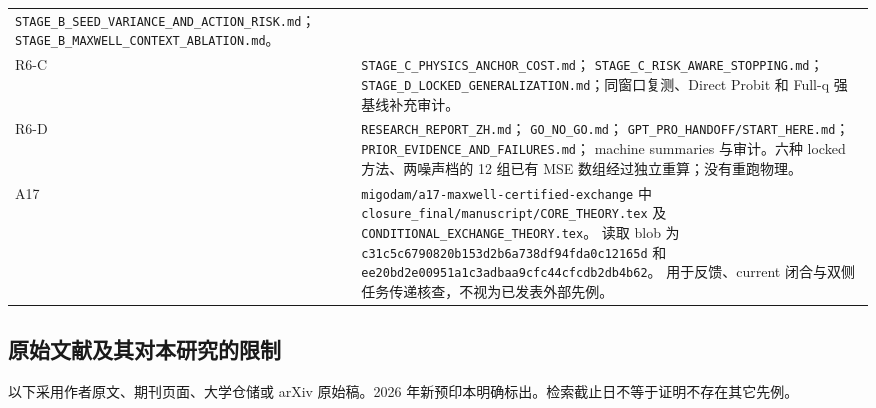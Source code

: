 \begin{longtable}{p{.08\linewidth}p{.84\linewidth}}
\texttt{STAGE\_B\_SEED\_VARIANCE\_AND\_ACTION\_RISK.md}；\newline 
\texttt{STAGE\_B\_MAXWELL\_CONTEXT\_ABLATION.md}。\\
R6-C & \texttt{STAGE\_C\_PHYSICS\_ANCHOR\_COST.md}；\newline 
\texttt{STAGE\_C\_RISK\_AWARE\_STOPPING.md}；\newline 
\texttt{STAGE\_D\_LOCKED\_GENERALIZATION.md}；\newline 同窗口复测、Direct Probit 和 Full-q 强基线补充审计。\\
R6-D & \texttt{RESEARCH\_REPORT\_ZH.md}；\newline 
\texttt{GO\_NO\_GO.md}；\newline 
\texttt{GPT\_PRO\_HANDOFF/START\_HERE.md}；\newline 
\texttt{PRIOR\_EVIDENCE\_AND\_FAILURES.md}；\newline 
machine summaries 与审计。六种 locked 方法、两噪声档的 12 组已有 MSE 数组经过独立重算；没有重跑物理。\\
A17 & \texttt{migodam/a17-maxwell-certified-exchange} 中
\texttt{closure\_final/manuscript/CORE\_THEORY.tex} 及
\texttt{CONDITIONAL\_EXCHANGE\_THEORY.tex}。
读取 blob 为
\texttt{c31c5c6790820b153d2b6a738df94fda0c12165d} 和
\texttt{ee20bd2e00951a1c3adbaa9cfc44cfcdb2db4b62}。
用于反馈、current 闭合与双侧任务传递核查，不视为已发表外部先例。\\
\bottomrule
\end{longtable}

\subsection{原始文献及其对本研究的限制}
以下采用作者原文、期刊页面、大学仓储或 arXiv 原始稿。2026 年新预印本明确标出。检索截止日不等于证明不存在其它先例。

